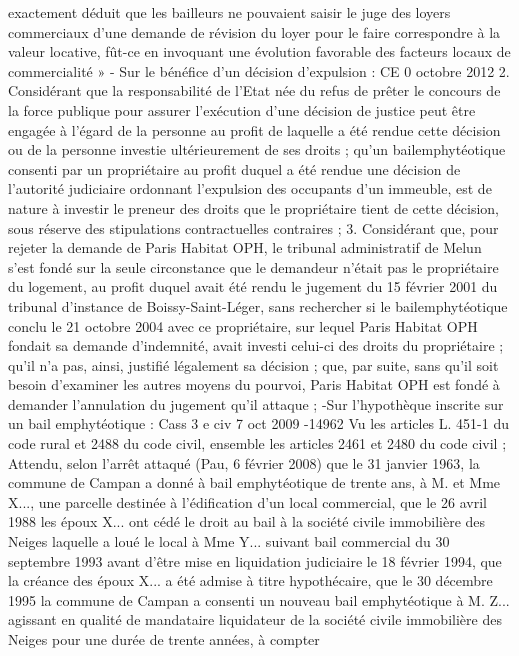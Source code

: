 \documentclass[11pt,a4paper]{report}
\begin{document}
	exactement déduit que les bailleurs ne pouvaient saisir le juge des loyers commerciaux d’une demande de
	révision du loyer pour le faire correspondre à la valeur locative, fût-ce en invoquant une évolution favorable des
	facteurs locaux de commercialité »
	- Sur le bénéfice d’un décision d’expulsion : CE 0 octobre 2012 
	2. Considérant que la responsabilité de l'Etat née du refus de prêter le concours de la force publique pour
	assurer l'exécution d'une décision de justice peut être engagée à l'égard de la personne au profit de laquelle a
	été rendue cette décision ou de la personne investie ultérieurement de ses droits ; qu'un bailemphytéotique
	consenti par un propriétaire au profit duquel a été rendue une décision de l'autorité judiciaire ordonnant
	l'expulsion des occupants d'un immeuble, est de nature à investir le preneur des droits que le propriétaire tient
	de cette décision, sous réserve des stipulations contractuelles contraires ;
	3. Considérant que, pour rejeter la demande de Paris Habitat OPH, le tribunal administratif de Melun s'est
	fondé sur la seule circonstance que le demandeur n'était pas le propriétaire du logement, au profit duquel avait
	été rendu le jugement du 15 février 2001 du tribunal d'instance de Boissy-Saint-Léger, sans rechercher si le
	bailemphytéotique conclu le 21 octobre 2004 avec ce propriétaire, sur lequel Paris Habitat OPH fondait sa
	demande d'indemnité, avait investi celui-ci des droits du propriétaire ; qu'il n'a pas, ainsi, justifié légalement sa
	décision ; que, par suite, sans qu'il soit besoin d'examiner les autres moyens du pourvoi, Paris Habitat OPH est
	fondé à demander l'annulation du jugement qu'il attaque ;
	-Sur l’hypothèque inscrite sur un bail emphytéotique : Cass 3 e civ 7 oct 2009 -14962
	Vu les articles L. 451-1 du code rural et 2488 du code civil, ensemble les articles 2461 et 2480 du code civil ;
	Attendu, selon l'arrêt attaqué (Pau, 6 février 2008) que le 31 janvier 1963, la commune de Campan a donné à
	bail emphytéotique de trente ans, à M. et Mme X..., une parcelle destinée à l'édification d'un local commercial,
	que le 26 avril 1988 les époux X... ont cédé le droit au bail à la société civile immobilière des Neiges laquelle a
	loué le local à Mme Y... suivant bail commercial du 30 septembre 1993 avant d'être mise en liquidation
	judiciaire le 18 février 1994, que la créance des époux X... a été admise à titre hypothécaire, que le 30 décembre
	1995 la commune de Campan a consenti un nouveau bail emphytéotique à M. Z... agissant en qualité de
	mandataire liquidateur de la société civile immobilière des Neiges pour une durée de trente années, à compter
\end{document}
